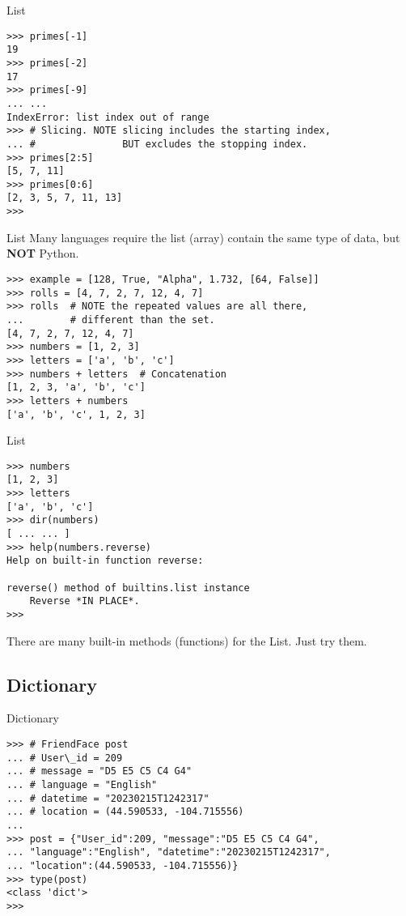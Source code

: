 \documentclass{beamer}
\begin{document}
\begin{frame}[fragile]{List}
\begin{verbatim}
>>> primes[-1]
19
>>> primes[-2]
17
>>> primes[-9]
... ...
IndexError: list index out of range
>>> # Slicing. NOTE slicing includes the starting index,
... #               BUT excludes the stopping index.
>>> primes[2:5]
[5, 7, 11]
>>> primes[0:6]
[2, 3, 5, 7, 11, 13]
>>>
\end{verbatim}
\end{frame}

\begin{frame}[fragile]{List}
Many languages require the list (array) contain the same type of data, 
but \textbf{NOT} Python.\\
\begin{verbatim}
>>> example = [128, True, "Alpha", 1.732, [64, False]]
>>> rolls = [4, 7, 2, 7, 12, 4, 7]
>>> rolls  # NOTE the repeated values are all there, 
...        # different than the set.
[4, 7, 2, 7, 12, 4, 7]
>>> numbers = [1, 2, 3]
>>> letters = ['a', 'b', 'c']
>>> numbers + letters  # Concatenation
[1, 2, 3, 'a', 'b', 'c']
>>> letters + numbers
['a', 'b', 'c', 1, 2, 3]
\end{verbatim}
\end{frame}

\begin{frame}[fragile]{List}
\begin{verbatim}
>>> numbers
[1, 2, 3]
>>> letters
['a', 'b', 'c']
>>> dir(numbers)
[ ... ... ]
>>> help(numbers.reverse)
Help on built-in function reverse:

reverse() method of builtins.list instance
    Reverse *IN PLACE*.
>>> 
\end{verbatim}
There are many built-in methods (functions) for the List. Just try them.
\end{frame}

\subsection{Dictionary}

\begin{frame}[fragile]{Dictionary}
\begin{verbatim}
>>> # FriendFace post
... # User\_id = 209
... # message = "D5 E5 C5 C4 G4"
... # language = "English"
... # datetime = "20230215T1242317"
... # location = (44.590533, -104.715556)
... 
>>> post = {"User_id":209, "message":"D5 E5 C5 C4 G4",
... "language":"English", "datetime":"20230215T1242317",
... "location":(44.590533, -104.715556)}
>>> type(post)
<class 'dict'>
>>> 
\end{verbatim}
\end{frame}
\end{document}
